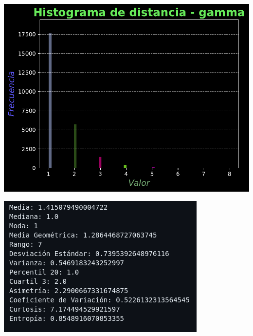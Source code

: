 \documentclass[11pt]{article} %
\begin{document}
	\begin{multicols}{2}
		\begin{minipage}{\linewidth}
			\centering
			\includegraphics[width=1\linewidth]{hist_distancia_gamma.pdf}
			\label{fig:distGammaHist}
		\end{minipage}
		\vfill\columnbreak
		\begin{minipage}{\linewidth}
			\centering
			\includegraphics[width=1\linewidth]{g2.png}%
			\label{distGammaMet}
		\end{minipage}
	\end{multicols}
	
\end{document}
